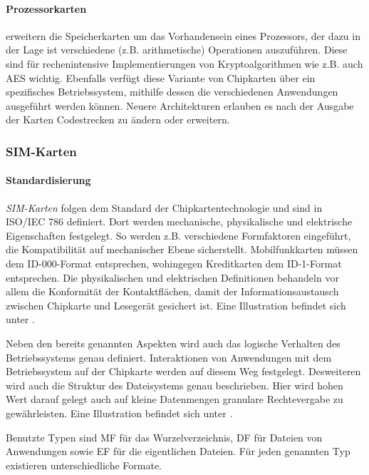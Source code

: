 \paragraph{Prozessorkarten} erweitern die Speicherkarten um das Vorhandensein
eines Prozessors, der dazu in der Lage ist verschiedene (z.B. arithmetische)
Operationen auszuführen. Diese sind für rechenintensive Implementierungen
von Kryptoalgorithmen wie z.B. auch AES wichtig. Ebenfalls verfügt diese
Variante von Chipkarten über ein spezifisches Betriebssystem, mithilfe dessen
die verschiedenen Anwendungen ausgeführt werden können.
Neuere Architekturen erlauben es nach der Ausgabe der Karten Codestrecken
zu ändern oder erweitern.

\subsubsection[SIM-Karten (Schenkel)]{SIM-Karten}

\paragraph{Standardisierung}
\textit{SIM-Karten} folgen dem Standard der Chipkartentechnologie und sind in
ISO/IEC 786 definiert. Dort werden mechanische, physikalische und elektrische
Eigenschaften festgelegt.
So werden z.B. verschiedene Formfaktoren eingeführt, die Kompatibilität
auf mechanischer Ebene sicherstellt. Mobilfunkkarten müssen dem ID-000-Format
entsprechen, wohingegen Kreditkarten dem ID-1-Format entsprechen. Die physikalischen und elektrischen
Definitionen behandeln vor allem die Konformität der Kontaktflächen, damit
der Informationsaustausch zwischen Chipkarte und Lesegerät gesichert ist.
Eine Illustration befindet sich unter .

Neben den bereits genannten Aspekten wird auch das logische Verhalten des Betriebssystems
genau definiert. Interaktionen von Anwendungen mit dem Betriebssystem auf der Chipkarte
werden auf diesem Weg festgelegt. Desweiteren wird auch die Struktur des Dateisystems
genau beschrieben. Hier wird hohen Wert darauf gelegt auch auf kleine Datenmengen
granulare Rechtevergabe zu gewährleisten.
Eine Illustration befindet sich unter .

Benutzte Typen sind \ac{MF} für das Wurzelverzeichnis,
\ac{DF} für Dateien von Anwendungen sowie
\ac{EF} für die eigentlichen Dateien. Für jeden genannten Typ
existieren unterschiedliche Formate.

